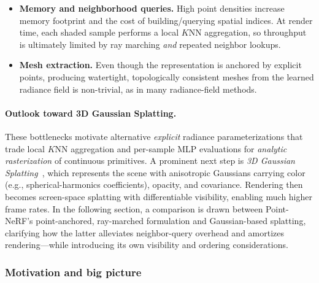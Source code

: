 \begin{enrichment}
\begin{enrichment}
\begin{enrichment}
\begin{itemize}
            \item \textbf{Memory and neighborhood queries.}
            High point densities increase memory footprint and the cost of building/querying spatial indices.
            At render time, each shaded sample performs a local $K$NN aggregation, so throughput is ultimately limited by ray marching \emph{and} repeated neighbor lookups.
            
            \item \textbf{Mesh extraction.}
            Even though the representation is anchored by explicit points, producing watertight, topologically consistent meshes from the learned radiance field is non-trivial, as in many radiance-field methods.
        \end{itemize}
        
        \paragraph{Outlook toward 3D Gaussian Splatting.}
        These bottlenecks motivate alternative \emph{explicit} radiance parameterizations that trade local $K$NN aggregation and per-sample MLP evaluations for \emph{analytic rasterization} of continuous primitives.
        A prominent next step is \emph{3D Gaussian Splatting}~\cite{kerbl2023_3dgaussiansplatting}, which represents the scene with anisotropic Gaussians carrying color (e.g., spherical-harmonics coefficients), opacity, and covariance.
        Rendering then becomes screen-space splatting with differentiable visibility, enabling much higher frame rates.
        In the following section, a comparison is drawn between Point-NeRF’s point-anchored, ray-marched formulation and Gaussian-based splatting, clarifying how the latter alleviates neighbor-query overhead and amortizes rendering—while introducing its own visibility and ordering considerations.
        
    \end{enrichment}    
    
    \newpage
    
    \begin{enrichment}
        \label{enr:subsec_chapter23_gaussian_splatting}
        
        \subsubsection{Motivation and big picture}
        \label{subsubsec:chapter23_gaussian_splatting_motivation}
        

\end{enrichment}
\end{enrichment}
\end{enrichment}
